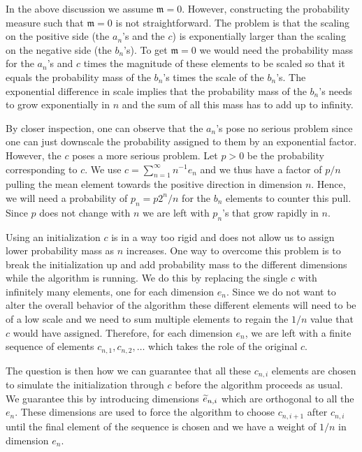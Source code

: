 \documentclass[10pt]{amsart}
\theoremstyle{definition}\newtheorem{defi}[theo]{Definition}\newtheorem{rema}[theo]{Remark}\newtheorem{exam}[theo]{Example}\newtheorem{exem}[theo]{Example}\newtheorem{nota}[theo]{Notation}
\theoremstyle{remark}
\newcommand{\mean}{\mathfrak{m}}
\let\oldtilde\tilde
\renewcommand*{\tilde}[1]{\mathchoice{\widetilde{#1}}{\widetilde{#1}}{\oldtilde{#1}}{\oldtilde{#1}}}
\begin{document}
In the above discussion we assume $\mean = 0$. However, constructing the probability measure such that $\mean = 0$ is not straightforward. The problem is that the scaling on the positive side (the $a_n$'s and the $c$) is exponentially larger than the scaling on the negative side (the $b_n$'s). To get $\mean = 0$ we would need the probability mass for the $a_n$'s and $c$ times the magnitude of these elements to be scaled so that it equals the probability mass of the $b_n$'s times the scale of the $b_n$'s. The exponential difference in scale implies that the probability mass of the $b_n$'s needs to grow exponentially in $n$ and the sum of all this mass has to add up to infinity.

By closer inspection, one can observe that the $a_n$'s pose no serious problem since one can just downscale the probability assigned to them by an exponential factor. However, the $c$ poses a more serious problem. Let $p > 0$ be the probability corresponding to $c$. We use $c= \sum_{n=1}^\infty n^{-1} e_n$ and we thus have a factor of $p/n$ pulling the mean element towards the positive direction in dimension $n$. Hence, we will need a probability of $p_n = p 2^n/n$ for the $b_n$ elements to counter this pull. Since $p$ does not change with $n$ we are left with $p_n$'s that grow rapidly in $n$.

Using an initialization $c$ is in a way too rigid and does not allow us to assign lower probability mass as $n$ increases. One way to overcome this problem is to break the initialization up and add probability mass to the different dimensions while the algorithm is running. We do this by replacing the single $c$ with infinitely many elements, one for each dimension $e_n$. Since we do not want to alter the overall behavior of the algorithm these different elements will need to be of a low scale and we need to sum multiple elements to regain the $1/n$ value that $c$ would have assigned. Therefore, for each dimension $e_n$, we are left with a finite sequence of elements $c_{n,1}, c_{n,2},\dots$ which takes the role of the original $c$.

The question is then how we can guarantee that all these $c_{n,i}$ elements are chosen to simulate the initialization through $c$ before the algorithm proceeds as usual. We guarantee this by introducing dimensions $\tilde e_{n,i}$ which are orthogonal to all the $e_n$. These dimensions are used to force the algorithm to choose $c_{n,i+1}$ after $c_{n,i}$ until the final element of the sequence is chosen and we have a weight of $1/n$ in dimension $e_n$.
\end{document}
